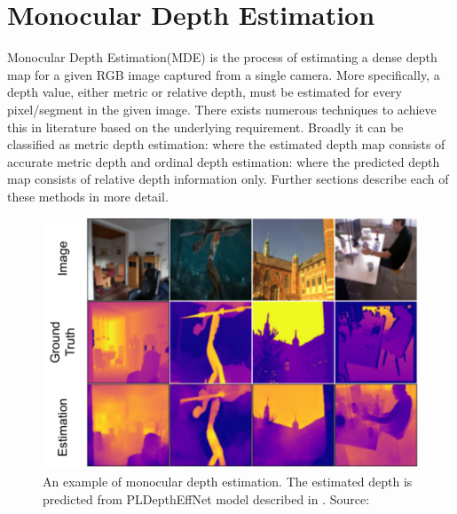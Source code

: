 \section{Monocular Depth Estimation}
\label{sec:related:sec3}
Monocular Depth Estimation(MDE) is the process of estimating a dense depth map for a given RGB image captured from a single camera. More specifically, a depth value, either metric or relative depth, must be estimated for every pixel/segment in the given image. There exists numerous techniques to achieve this in literature based on the underlying requirement. Broadly it can be classified as metric depth estimation: where the estimated depth map consists of accurate metric depth and ordinal depth estimation: where the predicted depth map consists of relative depth information only. Further sections describe each of these methods in more detail.
\begin{figure}[h]
	\centering
	\includegraphics[width=\textwidth]{content/imgs/mde_img.drawio}
	\caption{An example of monocular depth estimation. The estimated depth is predicted from PLDepthEffNet model described in \cite{Lienen_2021_CVPR}. Source:\cite{Lienen_2021_CVPR}}
	\label{fig:mdeimg}
\end{figure}

